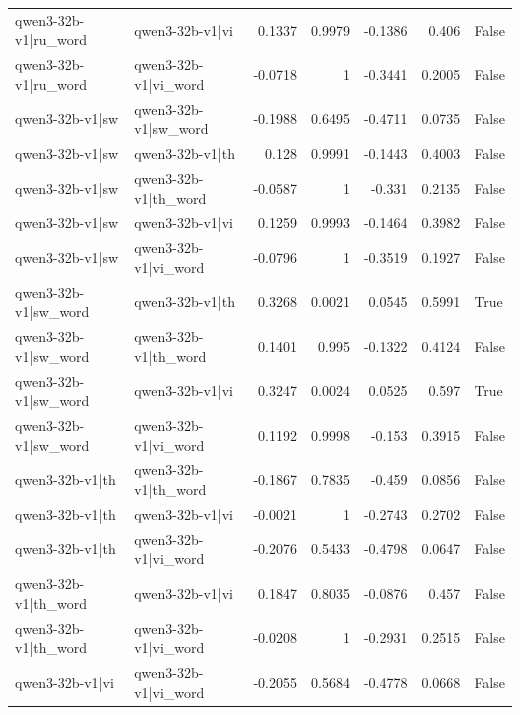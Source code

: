 \begin{table}
\begin{tabular}{l l r r r r l}
qwen3-32b-v1|ru_word & qwen3-32b-v1|vi & 0.1337 & 0.9979 & -0.1386 & 0.406 & False \\
qwen3-32b-v1|ru_word & qwen3-32b-v1|vi_word & -0.0718 & 1 & -0.3441 & 0.2005 & False \\
qwen3-32b-v1|sw & qwen3-32b-v1|sw_word & -0.1988 & 0.6495 & -0.4711 & 0.0735 & False \\
qwen3-32b-v1|sw & qwen3-32b-v1|th & 0.128 & 0.9991 & -0.1443 & 0.4003 & False \\
qwen3-32b-v1|sw & qwen3-32b-v1|th_word & -0.0587 & 1 & -0.331 & 0.2135 & False \\
qwen3-32b-v1|sw & qwen3-32b-v1|vi & 0.1259 & 0.9993 & -0.1464 & 0.3982 & False \\
qwen3-32b-v1|sw & qwen3-32b-v1|vi_word & -0.0796 & 1 & -0.3519 & 0.1927 & False \\
qwen3-32b-v1|sw_word & qwen3-32b-v1|th & 0.3268 & 0.0021 & 0.0545 & 0.5991 & True \\
qwen3-32b-v1|sw_word & qwen3-32b-v1|th_word & 0.1401 & 0.995 & -0.1322 & 0.4124 & False \\
qwen3-32b-v1|sw_word & qwen3-32b-v1|vi & 0.3247 & 0.0024 & 0.0525 & 0.597 & True \\
qwen3-32b-v1|sw_word & qwen3-32b-v1|vi_word & 0.1192 & 0.9998 & -0.153 & 0.3915 & False \\
qwen3-32b-v1|th & qwen3-32b-v1|th_word & -0.1867 & 0.7835 & -0.459 & 0.0856 & False \\
qwen3-32b-v1|th & qwen3-32b-v1|vi & -0.0021 & 1 & -0.2743 & 0.2702 & False \\
qwen3-32b-v1|th & qwen3-32b-v1|vi_word & -0.2076 & 0.5433 & -0.4798 & 0.0647 & False \\
qwen3-32b-v1|th_word & qwen3-32b-v1|vi & 0.1847 & 0.8035 & -0.0876 & 0.457 & False \\
qwen3-32b-v1|th_word & qwen3-32b-v1|vi_word & -0.0208 & 1 & -0.2931 & 0.2515 & False \\
qwen3-32b-v1|vi & qwen3-32b-v1|vi_word & -0.2055 & 0.5684 & -0.4778 & 0.0668 & False \\
\bottomrule
\end{tabular}
\end{table}
